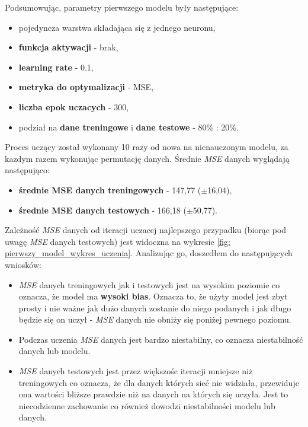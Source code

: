 \documentclass[12pt]{aghdpl}
\begin{document}
		Podsumowując, parametry pierwszego modelu były następujące:
		\begin{itemize}
		\item pojedyncza warstwa składająca się z jednego neuronu,
		\item \textbf{funkcja aktywacji} - brak,
		\item \textbf{learning rate} - 0.1,
		\item \textbf{metryka do optymalizacji} - MSE,
		\item \textbf{liczba epok uczacych} - 300,
		\item podział na \textbf{dane treningowe} i \textbf{dane testowe} - 80\% : 20\%.
		\end{itemize}
				
		Proces uczący został wykonany 10 razy od nowa na nienauczonym modelu, za kazdym razem wykonując permutację danych. Średnie \textit{MSE} danych wyglądają następująco:
		\begin{itemize}
		\item \textbf{średnie MSE danych treningowych} - 147,77 ($\pm$16,04),
		\item \textbf{średnie MSE danych testowych} - 166,18 ($\pm$50,77).
		\end{itemize}
		Zależność \textit{MSE} danych od iteracji uczacej najlepszego przypadku (biorąc pod uwagę \textit{MSE} danych testowych) jest widoczna na wykresie \ref{fig: pierwszy_model_wykres_uczenia}. Analizując go, doszedłem do następujących wniosków:
		\begin{itemize}
		\item \textit{MSE} danych treningowych jak i testowych jest na wysokim poziomie co oznacza, że model ma \textbf{wysoki bias}. Oznacza to, że użyty model jest zbyt prosty i nie ważne jak dużo danych zostanie do niego podanych i jak długo będzie się on uczył - \textit{MSE} danych nie obniży się poniżej pewnego poziomu.
		\item Podczas uczenia \textit{MSE} danych jest bardzo niestabilny, co oznacza niestabilność danych lub modelu.
		\item \textit{MSE} danych testowych jest przez większośc iteracji mniejsze niż treningowych co oznacza, że dla danych których sieć nie widziała, przewiduje ona wartości bliższe prawdzie niż na danych na których się uczyła. Jest to niecodzienne zachowanie co również dowodzi niestabilności modelu lub danych.
		\end{itemize}
		
\end{document}
